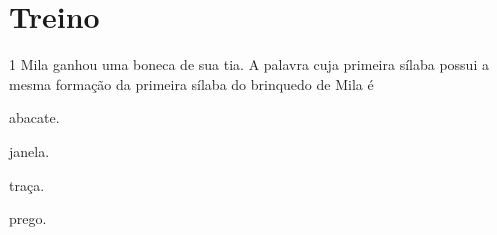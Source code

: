 
\section*{Treino}

\num{1} Mila ganhou uma boneca de sua tia. A palavra 
cuja primeira sílaba possui a mesma formação da primeira
sílaba do brinquedo de Mila é


\begin{escolha}
\item abacate.

\item janela.

\item traça.

\item prego.
\end{escolha}


